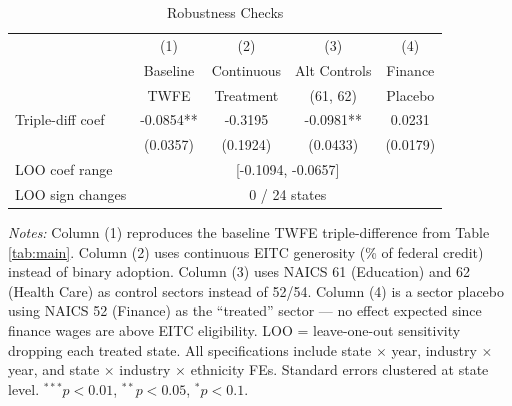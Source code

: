 \begin{table}[htbp]
\centering
\caption{Robustness Checks}
\label{tab:robust}
\begin{tabular}{lcccc}
\hline\hline
 & (1) & (2) & (3) & (4) \\
 & Baseline & Continuous & Alt Controls & Finance \\
 & TWFE & Treatment & (61, 62) & Placebo \\
\hline
Triple-diff coef & -0.0854** & -0.3195 & -0.0981** & 0.0231 \\
 & (0.0357) & (0.1924) & (0.0433) & (0.0179) \\
\hline
LOO coef range & \multicolumn{4}{c}{[-0.1094, -0.0657]} \\
LOO sign changes & \multicolumn{4}{c}{0 / 24 states} \\
\hline\hline
\end{tabular}
\begin{tablenotes}[flushleft]
\small
\item \textit{Notes:} Column (1) reproduces the baseline TWFE triple-difference from Table \ref{tab:main}. Column (2) uses continuous EITC generosity (\% of federal credit) instead of binary adoption. Column (3) uses NAICS 61 (Education) and 62 (Health Care) as control sectors instead of 52/54. Column (4) is a sector placebo using NAICS 52 (Finance) as the ``treated'' sector --- no effect expected since finance wages are above EITC eligibility. LOO = leave-one-out sensitivity dropping each treated state. All specifications include state $\times$ year, industry $\times$ year, and state $\times$ industry $\times$ ethnicity FEs. Standard errors clustered at state level. $^{***}p<0.01$, $^{**}p<0.05$, $^{*}p<0.1$.
\end{tablenotes}
\end{table}

